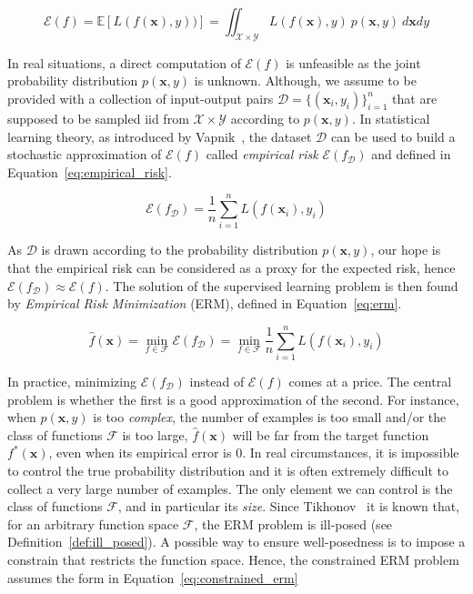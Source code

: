 \begin{equation} \label{eq:expected_loss}
	\mathcal{E}(f) = \mathbb{E}[L(f(\bm{x}),y))] = \iint_{\mathcal{X} \times \mathcal{Y}}L(f(\bm{x}),y)~p(\bm{x},y)~d\bm{x}dy
\end{equation}

In real situations, a direct computation of $\mathcal{E}(f)$ is unfeasible as the joint probability distribution $p(\bm{x},y)$ is unknown. Although, we assume to be provided with a collection of input-output pairs $\mathcal{D}=\{(\bm{x}_i,y_i)\}_{i=1}^n$ that are supposed to be sampled \ac{iid} from $\mathcal{X} \times \mathcal{Y}$ according to $p(\bm{x}, y)$.
In statistical learning theory, as introduced by Vapnik~\cite{vapnik2013nature}, the dataset $\mathcal{D}$ can be used to build a stochastic approximation of $\mathcal{E}(f)$ called \textit{empirical risk} $\mathcal{E}(f_{\mathcal{D}})$ and defined in Equation~\eqref{eq:empirical_risk}.

\begin{equation} \label{eq:empirical_risk}
	\mathcal{E}(f_{\mathcal{D}}) = \frac{1}{n} \sum_{i=1}^{n} L(f(\bm{x}_i), y_i)
\end{equation}

As $\mathcal{D}$ is drawn according to the probability distribution $p(\bm{x},y)$, our hope is that the empirical risk can be considered as a proxy for the expected risk, hence $\mathcal{E}(f_{\mathcal{D}}) \approx \mathcal{E}(f)$. The solution of the supervised learning problem is then found by \textit{Empirical Risk Minimization} (ERM), defined in Equation~\eqref{eq:erm}.

\begin{equation} \label{eq:erm}
	\hat f(\bm{x}) = \min_{f \in \mathcal{F}}{\mathcal{E}(f_{\mathcal{D}})} = \min_{f \in \mathcal{F}}{\frac{1}{n} \sum_{i=1}^{n} L(f(\bm{x}_i), y_i)}
\end{equation}

In practice, minimizing $\mathcal{E}(f_{\mathcal{D}})$ instead of $\mathcal{E}(f)$ comes at a price. The central problem is whether the first is a good approximation of the second. For instance, when $p(\bm{x}, y)$ is too \textit{complex}, the number of examples is too small and/or the class of functions $\mathcal{F}$ is too large, $\hat f(\bm{x})$ will be far from the target function $f^*(\bm{x})$, even when its empirical error is $0$. In real circumstances, it is impossible to control the true probability distribution and it is often extremely difficult to collect a very large number of examples. The only element we can control is the class of functions $\mathcal{F}$, and in particular its \textit{size}. Since Tikhonov~\cite{tikhonov1963solution} it is known that, for an arbitrary function space $\mathcal{F}$, the ERM problem is ill-posed (see Definition~\ref{def:ill_posed}). A possible way to ensure well-posedness is to impose a constrain that restricts the function space. Hence, the constrained ERM problem assumes the form in Equation~\eqref{eq:constrained_erm}

